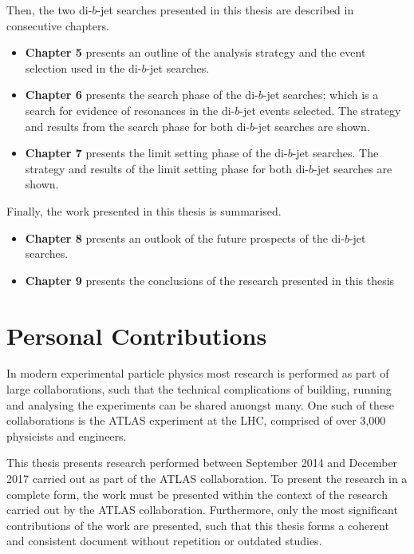 \noindent
Then, the two di-$b$-jet searches presented in this thesis are described in consecutive chapters. %
\vspace{-2em}
\begin{itemize}[leftmargin=*]
\item\textbf{Chapter 5} presents an outline of the analysis strategy and the event selection used in the \mbox{di-$b$-jet} searches.%
\item\textbf{Chapter 6} presents the search phase of the di-$b$-jet searches;
  which is a search for evidence of resonances in the di-$b$-jet events selected.
  The strategy and results from the search phase for both di-$b$-jet searches are shown.%
\item\textbf{Chapter 7} presents the limit setting phase of the di-$b$-jet searches.
  The strategy and results of the limit setting phase for both di-$b$-jet searches are shown.%
\end{itemize}

\noindent
Finally, the work presented in this thesis is summarised.
\vspace{-0.5em}
  \begin{itemize}[leftmargin=*]
\item\textbf{Chapter 8} presents an outlook of the future prospects of the di-$b$-jet searches.%
\item\textbf{Chapter 9} presents the conclusions of the research presented in this thesis%
\end{itemize}
\clearpage
\section{Personal Contributions}

In modern experimental particle physics most research is performed as part of large collaborations,
such that the technical complications of building, running and analysing the experiments can be shared amongst many.
One such of these collaborations is the ATLAS experiment at the LHC, comprised of over 3,000 physicists and engineers.

This thesis presents research performed between September 2014 and December 2017 carried out as part of the ATLAS collaboration.
To present the research in a complete form, the work must be presented within the context of the research carried out by the ATLAS collaboration.
Furthermore, only the most significant contributions of the work are presented,
such that this thesis forms a coherent and consistent document without repetition or outdated studies.

